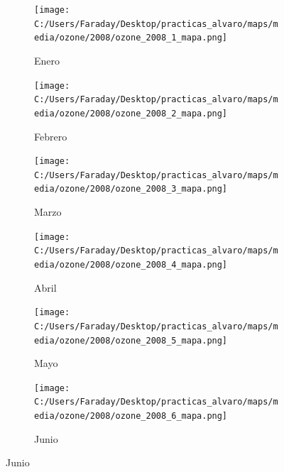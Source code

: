 \documentclass[12pt]{article}
\begin{document}
\begin{figure}[H]
\centering
\begin{subfigure}[H]{0.15\textwidth}
\texttt{[image: C:/Users/Faraday/Desktop/practicas\_alvaro/maps/media/ozone/2008/ozone\_2008\_1\_mapa.png]}
\captionsetup{labelformat=empty}
\caption{Enero}
\label{fig:map-ozone-2008-1}
\end{subfigure}
%
\begin{subfigure}[H]{0.15\textwidth}
\texttt{[image: C:/Users/Faraday/Desktop/practicas\_alvaro/maps/media/ozone/2008/ozone\_2008\_2\_mapa.png]}
\captionsetup{labelformat=empty}
\caption{Febrero}
\label{fig:map-ozone-2008-2}
\end{subfigure}
%
\begin{subfigure}[H]{0.15\textwidth}
\texttt{[image: C:/Users/Faraday/Desktop/practicas\_alvaro/maps/media/ozone/2008/ozone\_2008\_3\_mapa.png]}
\captionsetup{labelformat=empty}
\caption{Marzo}
\label{fig:map-ozone-2008-3}
\end{subfigure}
%
\begin{subfigure}[H]{0.15\textwidth}
\texttt{[image: C:/Users/Faraday/Desktop/practicas\_alvaro/maps/media/ozone/2008/ozone\_2008\_4\_mapa.png]}
\captionsetup{labelformat=empty}
\caption{Abril}
\label{fig:map-ozone-2008-4}
\end{subfigure}
%
\begin{subfigure}[H]{0.15\textwidth}
\texttt{[image: C:/Users/Faraday/Desktop/practicas\_alvaro/maps/media/ozone/2008/ozone\_2008\_5\_mapa.png]}
\captionsetup{labelformat=empty}
\caption{Mayo}
\label{fig:map-ozone-2008-5}
\end{subfigure}
%
\begin{subfigure}[H]{0.15\textwidth}
\texttt{[image: C:/Users/Faraday/Desktop/practicas\_alvaro/maps/media/ozone/2008/ozone\_2008\_6\_mapa.png]}
\captionsetup{labelformat=empty}
\caption{Junio}
\label{fig:map-ozone-2008-6}
\end{subfigure}


\end{figure}
\end{document}
